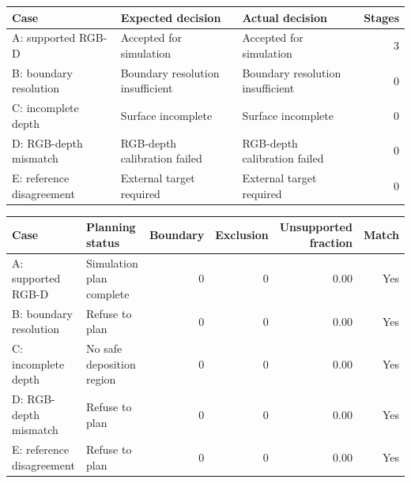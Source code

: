 \begin{tabularx}{\linewidth}{>{\raggedright\arraybackslash}X >{\raggedright\arraybackslash}X >{\raggedright\arraybackslash}X r}
\toprule
Case & Expected decision & Actual decision & Stages \\
\midrule
A: supported RGB-D & Accepted for simulation & Accepted for simulation & 3 \\
B: boundary resolution & Boundary resolution insufficient & Boundary resolution insufficient & 0 \\
C: incomplete depth & Surface incomplete & Surface incomplete & 0 \\
D: RGB-depth mismatch & RGB-depth calibration failed & RGB-depth calibration failed & 0 \\
E: reference disagreement & External target required & External target required & 0 \\
\bottomrule
\end{tabularx}

\begin{tabularx}{\linewidth}{>{\raggedright\arraybackslash}X >{\raggedright\arraybackslash}X r r r r}
\toprule
Case & Planning status & Boundary & Exclusion & \shortstack{Unsupported\\fraction} & Match \\
\midrule
A: supported RGB-D & Simulation plan complete & 0 & 0 & 0.00 & Yes \\
B: boundary resolution & Refuse to plan & 0 & 0 & 0.00 & Yes \\
C: incomplete depth & No safe deposition region & 0 & 0 & 0.00 & Yes \\
D: RGB-depth mismatch & Refuse to plan & 0 & 0 & 0.00 & Yes \\
E: reference disagreement & Refuse to plan & 0 & 0 & 0.00 & Yes \\
\bottomrule
\end{tabularx}
